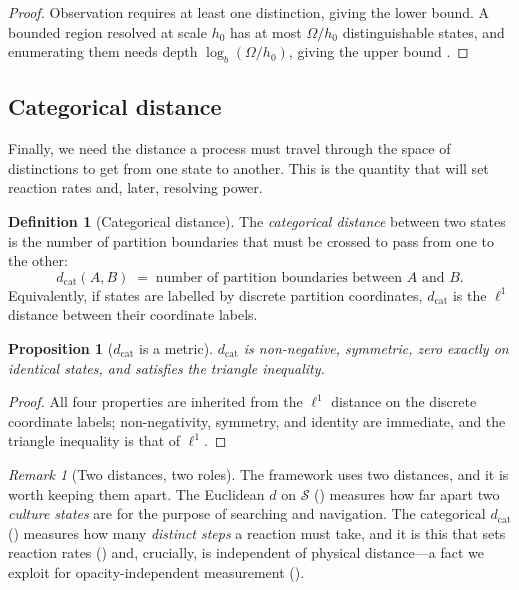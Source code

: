 \documentclass[11pt,twocolumn,a4paper]{article}
\theoremstyle{thmstyle}
\newtheorem{proposition}[theorem]{Proposition}
\theoremstyle{definition}
\newtheorem{definition}[theorem]{Definition}
\theoremstyle{remark}
\newtheorem{remark}[theorem]{Remark}
\newcommand{\Sspace}{\mathcal{S}}
\newcommand{\dcat}{d_{\mathrm{cat}}}
\begin{document}
\begin{proof}
Observation requires at least one distinction, giving the lower bound. A
bounded region resolved at scale $h_0$ has at most $\Omega/h_0$
distinguishable states, and enumerating them needs depth
$\log_b(\Omega/h_0)$, giving the upper bound
\citep{cover2006elements}.
\end{proof}

\subsection{Categorical distance}

Finally, we need the distance a process must travel through the space of
distinctions to get from one state to another. This is the quantity that
will set reaction rates and, later, resolving power.

\begin{definition}[Categorical distance]
\label{def:catdist}
The \emph{categorical distance} between two states is the number of
partition boundaries that must be crossed to pass from one to the other:
\[
\dcat(A,B)\;=\;\text{number of partition boundaries between } A \text{ and } B.
\]
Equivalently, if states are labelled by discrete partition coordinates,
$\dcat$ is the $\ell^1$ distance between their coordinate labels.
\end{definition}

\begin{proposition}[$\dcat$ is a metric]
\label{prop:catdist-metric}
$\dcat$ is non-negative, symmetric, zero exactly on identical states, and
satisfies the triangle inequality.
\end{proposition}

\begin{proof}
All four properties are inherited from the $\ell^1$ distance on the
discrete coordinate labels; non-negativity, symmetry, and identity are
immediate, and the triangle inequality is that of $\ell^1$.
\end{proof}

\begin{remark}[Two distances, two roles]
\label{rem:two-distances}
The framework uses two distances, and it is worth keeping them apart. The
Euclidean $d$ on $\Sspace$ () measures how far apart two
\emph{culture states} are for the purpose of searching and navigation. The
categorical $\dcat$ () measures how many \emph{distinct
steps} a reaction must take, and it is this that sets reaction rates
() and, crucially, is independent of physical
distance---a fact we exploit for opacity-independent measurement
().
\end{remark}
\end{document}

